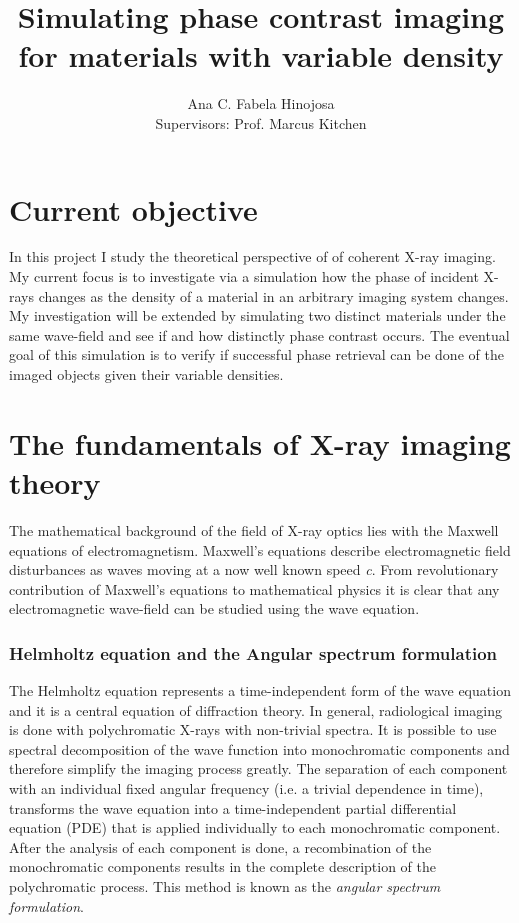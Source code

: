 \documentclass[9pt, a4paper]{article}
\title{Simulating phase contrast imaging for materials with variable density}
\author{Ana C. Fabela Hinojosa \\
\small{Supervisors: Prof. Marcus Kitchen}}
\begin{document}
\maketitle
\section{Current objective}
In this project I study the theoretical perspective of of coherent X-ray imaging. My current focus is to investigate via a simulation how the phase of incident X-rays changes as the density of a material in an arbitrary imaging system changes. My investigation will be extended by simulating two distinct materials under the same wave-field and see if and how distinctly phase contrast occurs. The eventual goal of this simulation is to verify if successful phase retrieval can be done of the imaged objects given their variable densities.

\section{The fundamentals of X-ray imaging theory}
The mathematical background of the field of X-ray optics lies with the Maxwell equations of electromagnetism\cite{PagsTutes}. Maxwell's equations describe electromagnetic field disturbances as waves moving at a now well known speed \textit{c}. From revolutionary contribution of Maxwell's equations to mathematical physics it is clear that any electromagnetic wave-field can be studied using the wave equation.

\subsubsection{Helmholtz equation and the Angular spectrum formulation}
The Helmholtz equation represents a time-independent form of the wave equation and it is a central equation of diffraction theory\cite{CH49}\cite{Pags2006}\cite{Helmholtz}.
In general, radiological imaging is done with polychromatic X-rays with non-trivial spectra\cite{CH49}. It is possible to use spectral decomposition of the wave function into monochromatic components and therefore simplify the imaging process greatly. The separation of each component with an individual fixed angular frequency (i.e. a trivial dependence in time), transforms the wave equation into a time-independent partial differential equation (PDE) that is applied individually to each monochromatic component. After the analysis of each component is done, a recombination of the monochromatic components results in the complete description of the polychromatic process\cite{CH49}\cite{Pags2006}. This method is known as the \textit{angular spectrum formulation}. 
\end{document}
